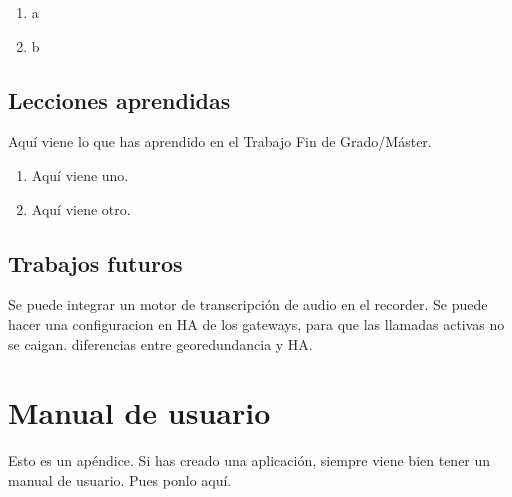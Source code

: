 \documentclass[a4paper, 12pt]{book}
\begin{document}
\begin{enumerate}
  \item a
  \item b
\end{enumerate}


\section{Lecciones aprendidas}
\label{sec:lecciones_aprendidas}

Aquí viene lo que has aprendido en el Trabajo Fin de Grado/Máster.

\begin{enumerate}
  \item Aquí viene uno.
  \item Aquí viene otro.
\end{enumerate}


\section{Trabajos futuros}
\label{sec:trabajos_futuros}

Se puede integrar un motor de transcripción de audio en el recorder.
Se puede hacer una configuracion en HA de los gateways, para que las llamadas activas no se caigan. diferencias entre georedundancia y HA.



\cleardoublepage
\appendix
\chapter{Manual de usuario}
\label{app:manual}

Esto es un apéndice.
Si has creado una aplicación, siempre viene bien tener un manual de usuario.
Pues ponlo aquí.


\cleardoublepage


\end{document}
